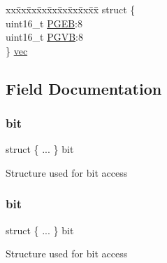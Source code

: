 \begin{DoxyCompactItemize}
\begin{tabbing}
\end{tabbing}\item 
\begin{tabbing}
xx\=xx\=xx\=xx\=xx\=xx\=xx\=xx\=xx\=\kill
struct \{\\
\>uint16\_t \mbox{\hyperlink{union_t_c_c___p_a_t_t_b___type_a98ef38dbeaf6e672d3fc6e49d1e75ded}{PGEB}}:8\\
\>uint16\_t \mbox{\hyperlink{union_t_c_c___p_a_t_t_b___type_a35f94f29f42835914433d5722ef59aab}{PGVB}}:8\\
\} \mbox{\hyperlink{union_t_c_c___p_a_t_t_b___type_a555508daa5f90b027cdab60580681144}{vec}}\\

\end{tabbing}\end{DoxyCompactItemize}


\subsection{Field Documentation}
\mbox{\label{union_t_c_c___p_a_t_t_b___type_a7e3d4b5a1c6bec89eec19874e1a135a7}} 
\subsubsection{\texorpdfstring{bit}{bit}\hspace{0.1cm}{\footnotesize\ttfamily [1/2]}}
{\footnotesize\ttfamily struct \{ ... \}   bit}

Structure used for bit access \mbox{\label{union_t_c_c___p_a_t_t_b___type_a9527bdf892a1bb573c092ab51ebd1a75}} 
\subsubsection{\texorpdfstring{bit}{bit}\hspace{0.1cm}{\footnotesize\ttfamily [2/2]}}
{\footnotesize\ttfamily struct \{ ... \}   bit}

Structure used for bit access \mbox{\label{union_t_c_c___p_a_t_t_b___type_a98ef38dbeaf6e672d3fc6e49d1e75ded}} 
